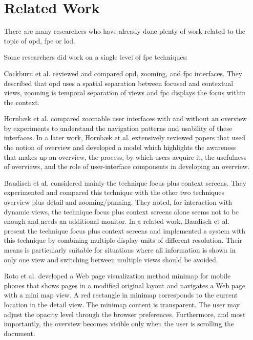 
\section{Related Work}

There are many researchers who have already done plenty of work related to the topic of \gls{opd}, \gls{fpc} or \gls{lod}.

Some researchers did work on a single level of \gls{fpc} techniques:

Cockburn et al. \cite{cockburn2006review, cockburn2009review} reviewed and compared \gls{opd}, zooming, and \gls{fpc} interfaces. They described that \gls{opd} uses a spatial separation between focused and contextual views, zooming is temporal separation of views and \gls{fpc} displays the focus within the context.

Hornb{\ae}k et al. \cite{hornbaek2002navigation} compared zoomable user interfaces with and without an overview by experiments to understand the navigation patterns and usability of these interfaces. In a later work, Hornb{\ae}k et al. \cite{hornbaek2011notion} extensively reviewed papers that used the notion of overview and developed a model which highlights the awareness that makes up an overview, the process, by which users acquire it, the usefulness of overviews, and the role of user-interface components in developing an overview.

Baudisch et al. considered mainly the technique focus plus context screens.\cite{baudisch2002keeping} They experimented and compared this technique with the other two techniques overview plus detail and zooming/panning. They noted, for interaction with dynamic views, the technique focus plus context screens alone seems not to be enough and needs an additional monitor. In a related work, Baudisch et al. \cite{baudisch2001focus} present the technique focus plus context screens and implemented a system with this technique by combining multiple display units of different resolution. Their means is particularly suitable for situations where all information is shown in only one view and switching between multiple views should be avoided.

Roto et al. \cite{roto2006minimap} developed a Web page visualization method minimap for mobile phones that shows pages in a modified original layout and navigates a Web page with a mini map view. A red rectangle in minimap corresponds to the current location in the detail view. The minimap content is transparent. The user may adjust the opacity level through the browser preferences. Furthermore, and most importantly, the overview becomes visible only when the user is scrolling the document.

